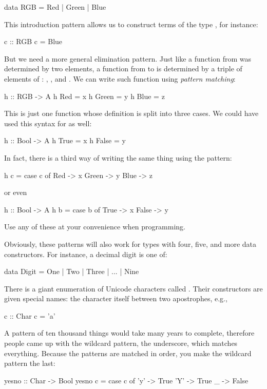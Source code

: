 \documentclass[DaoFP]{subfiles}
\begin{document}
\begin{haskell}
data RGB = Red | Green | Blue
\end{haskell}
This introduction pattern allows us to construct terms of the type , for instance:
\begin{haskell}
c :: RGB
c = Blue
\end{haskell}
But we need a more general elimination pattern. Just like a function from  was determined by two elements, a function from  to  is determined by a triple of elements of : , , and . We can write such function using \emph{pattern matching}:
\begin{haskell}
h :: RGB -> A
h Red   = x
h Green = y
h Blue  = z
\end{haskell}
This is just one function whose definition is split into three cases. We could have used this syntax for  as well:
\begin{haskell}
h :: Bool -> A
h True  = x
h False = y
\end{haskell}
In fact, there is a third way of writing the same thing using the  pattern:
\begin{haskell}
h c = case c of
  Red   -> x
  Green -> y
  Blue  -> z
\end{haskell}
or even
\begin{haskell}
h :: Bool -> A
h b = case b of
  True  -> x
  False -> y
\end{haskell}
Use any of these at your convenience when programming.

Obviously, these patterns will also work for types with four, five, and more data constructors. For instance, a decimal digit is one of:
\begin{haskell}
data Digit = One | Two | Three | ... | Nine
\end{haskell}

There is a giant enumeration of Unicode characters called . Their constructors are given special names: the character itself between two apostrophes, e.g.,
\begin{haskell}
c :: Char
c = 'a'
\end{haskell}
A pattern of ten thousand things would take many years to complete, therefore people came up with the wildcard pattern, the underscore, which matches everything. Because the patterns are matched in order, you make the wildcard pattern the last:
\begin{haskell}
yesno :: Char -> Bool
yesno c = case c of
  'y' -> True
  'Y' -> True
  _   -> False
\end{haskell}
\end{document}
